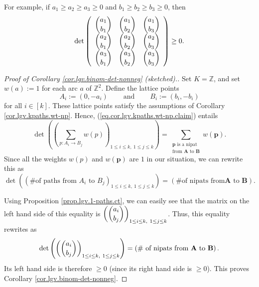 For example, if $a_{1}\geq a_{2}\geq a_{3}\geq0$ and $b_{1}\geq b_{2}\geq
b_{3}\geq0$, then%
\[
\det\left(
\begin{array}
[c]{ccc}%
\dbinom{a_{1}}{b_{1}} & \dbinom{a_{1}}{b_{2}} & \dbinom{a_{1}}{b_{3}}\\
\dbinom{a_{2}}{b_{1}} & \dbinom{a_{2}}{b_{2}} & \dbinom{a_{2}}{b_{3}}\\
\dbinom{a_{3}}{b_{1}} & \dbinom{a_{3}}{b_{2}} & \dbinom{a_{3}}{b_{3}}%
\end{array}
\right)  \geq0.
\]


\begin{proof}
[Proof of Corollary \ref{cor.lgv.binom-det-nonneg} (sketched).]Set
$K=\mathbb{Z}$, and set $w\left(  a\right)  :=1$ for each arc $a$ of
$\mathbb{Z}^{2}$. Define the lattice points%
\[
A_{i}:=\left(  0,-a_{i}\right)  \ \ \ \ \ \ \ \ \ \ \text{and}%
\ \ \ \ \ \ \ \ \ \ B_{i}:=\left(  b_{i},-b_{i}\right)
\]
for all $i\in\left[  k\right]  $. These lattice points satisfy the assumptions
of Corollary \ref{cor.lgv.kpaths.wt-np}. Hence,
(\ref{eq.cor.lgv.kpaths.wt-np.claim}) entails%
\begin{equation}
\det\left(  \left(  \sum_{p:A_{i}\rightarrow B_{j}}w\left(  p\right)  \right)
_{1\leq i\leq k,\ 1\leq j\leq k}\right)  =\sum_{\substack{\mathbf{p}\text{ is
a nipat}\\\text{from }\mathbf{A}\text{ to }\mathbf{B}}}w\left(  \mathbf{p}%
\right)  .\nonumber
\end{equation}
Since all the weights $w\left(  p\right)  $ and $w\left(  \mathbf{p}\right)  $
are $1$ in our situation, we can rewrite this as%
\begin{equation}
\det\left(  \left(  \text{\# of paths from }A_{i}\text{ to }B_{j}\right)
_{1\leq i\leq k,\ 1\leq j\leq k}\right)  =\left(  \text{\# of nipats from
}\mathbf{A}\text{ to }\mathbf{B}\right)  .\nonumber
\end{equation}


Using Proposition \ref{prop.lgv.1-paths.ct}, we can easily see that the matrix
on the left hand side of this equality is $\left(  \dbinom{a_{i}}{b_{j}%
}\right)  _{1\leq i\leq k,\ 1\leq j\leq k}$. Thus, this equality rewrites as%
\begin{equation}
\det\left(  \left(  \dbinom{a_{i}}{b_{j}}\right)  _{1\leq i\leq k,\ 1\leq
j\leq k}\right)  =\left(  \text{\# of nipats from }\mathbf{A}\text{ to
}\mathbf{B}\right)  .\nonumber
\end{equation}
Its left hand side is therefore $\geq0$ (since its right hand side is $\geq
0$). This proves Corollary \ref{cor.lgv.binom-det-nonneg}.
\end{proof}

